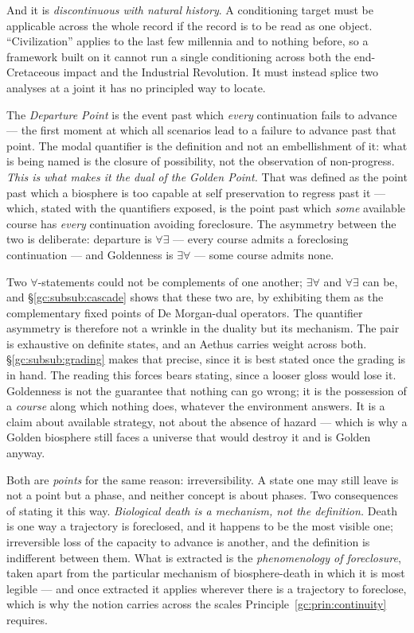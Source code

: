 And it is \emph{discontinuous with natural history}. A conditioning
target must be applicable across the whole record if the record is to be
read as one object. ``Civilization'' applies to the last few millennia
and to nothing before, so a framework built on it cannot run a single
conditioning across both the end-Cretaceous impact and the Industrial
Revolution. It must instead splice two analyses at a joint it has no
principled way to locate.

\begin{definition}\label{gc:def:departure}
The \emph{Departure Point} is the event past which \emph{every}
continuation fails to advance --- the first moment at which all
scenarios lead to a failure to advance past that point. The modal
quantifier is the definition and not an embellishment of it: what is
being named is the closure of possibility, not the observation of
non-progress. \emph{This is what makes it the dual of the Golden Point.} That was
defined as the point past which a biosphere is too capable at self
preservation to regress past it --- which, stated with the quantifiers
exposed, is the point past which \emph{some} available course has
\emph{every} continuation avoiding foreclosure. The asymmetry between
the two is deliberate: departure is $\forall\exists$ --- every course
admits a foreclosing continuation --- and Goldenness is
$\exists\forall$ --- some course admits none.

Two $\forall$-statements could not be complements of one another;
$\exists\forall$ and $\forall\exists$ can be, and
\S\ref{gc:subsub:cascade} shows that these two are, by exhibiting them
as the complementary fixed points of De Morgan-dual operators. The
quantifier asymmetry is therefore not a wrinkle in the duality but its
mechanism. The pair is exhaustive on definite states, and an Aethus carries weight
across both. \S\ref{gc:subsub:grading} makes that precise, since it is
best stated once the grading is in hand. The reading this forces bears stating, since a looser gloss
would lose it. Goldenness is not the guarantee that nothing can go
wrong; it is the possession of a \emph{course} along which nothing
does, whatever the environment answers. It is a claim about available
strategy, not about the absence of hazard --- which is why a Golden
biosphere still faces a universe that would destroy it and is Golden
anyway.

Both are \emph{points} for the same reason: irreversibility. A state
one may still leave is not a point but a phase, and neither concept is
about phases. Two consequences of stating it this way. \emph{Biological death is a mechanism, not the definition.} Death is one
way a trajectory is foreclosed, and it happens to be the most visible
one; irreversible loss of the capacity to advance is another, and the
definition is indifferent between them. What is extracted is the
\emph{phenomenology of foreclosure}, taken apart from the particular
mechanism of biosphere-death in which it is most legible --- and once
extracted it applies wherever there is a trajectory to foreclose,
which is why the notion carries across the scales
Principle~\ref{gc:prin:continuity} requires.


\end{definition}
